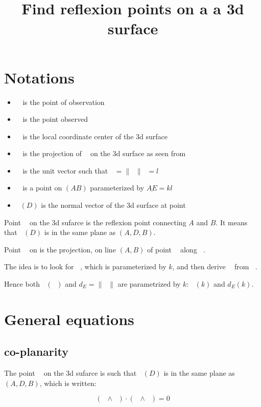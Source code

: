 \documentclass[10pt,a4paper]{article}
\title{Find reflexion points on a a 3d surface}
\newcommand{\ud}[1]{\underline{#1}}
\DeclareMathOperator{\cross}{\wedge}
\DeclareMathOperator{\A}{\ud{A}}
\DeclareMathOperator{\B}{\ud{B}}
\DeclareMathOperator{\C}{\ud{C}}
\DeclareMathOperator{\D}{\ud{D}}
\DeclareMathOperator{\E}{\ud{E}}
\DeclareMathOperator{\AB}{\ud{AB}}
\DeclareMathOperator{\DA}{\ud{DA}}
\DeclareMathOperator{\DB}{\ud{DB}}
\DeclareMathOperator{\ED}{\ud{ED}}
\DeclareMathOperator{\e}{\ud{e}}
\DeclareMathOperator{\n}{\ud{n}}
\begin{document}
\maketitle




\section{Notations}

\begin{itemize}
    \item $\A$ is the point of observation
    \item $\B$ is the point observed
    \item $\C$ is the local coordinate center of the 3d surface
    \item $\D$ is the projection of $\B$ on the 3d surface as seen from $\A$
    \item $\e$ is the unit vector such that $\AB = \|\AB\|\e = l\e$
    \item $\E$ is a point on $(AB)$ parameterized by $\ud{AE} = kl\e$
    \item $\n(D)$ is the normal vector of the 3d surface at point $\D$
\end{itemize}


Point $\D$ on the 3d sufarce is the reflexion point connecting $A$ and $B$.
It means that $\n(D)$ is in the same plane as $(A, D, B)$.

Point $\E$ on is the projection, on line $(A, B)$ of point $\D$ along $\n$.


The idea is to look for $\E$, which is parameterized by $k$, and then derive
$\D$ from $\E$.

Hence both $\n(\D)$ and $d_E = \|\ED\|$ are parametrized by $k$:
$\n(k)$ and $d_E(k)$.


\section{General equations}

\subsection{co-planarity}

The point $\D$ on the 3d sufarce is such that $\n(D)$ is in the same plane as
$(A, D, B)$, which is written:

\begin{equation}
( \DA \cross \n ) \cdot ( \DB \cross \n ) = 0
\end{equation}
\end{document}
